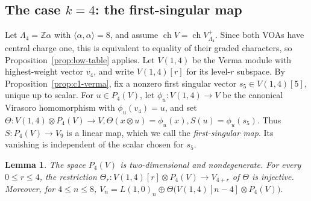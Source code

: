 \documentclass[12pt,leqno]{amsart}
\numberwithin{equation}{section} \newtheorem{thm}{Theorem}[section] \newtheorem{lem}[thm]{Lemma} \newtheorem{ex}[thm]{Example} \newtheorem{prop}[thm]{Proposition} \newtheorem{cor}[thm]{Corollary} \newtheorem{defi}[thm]{Definition} \newtheorem{rmk}[thm]{Remark} \newtheorem{notation}[thm]{Notation}
\newcommand{\ch}{\operatorname{ch}}
\def\Z{\mathbb{Z}} \def\N{\mathbb{N}} \def\A{\mathbb{A}} \def\C{\mathbb{C}} \def\R{\mathbb{R}} \def\Q{\mathbb{Q}} \def\F{\mathbb{F}}
\begin{document}
\subsection{The case \texorpdfstring{$k=4$}{k=4}: the first-singular map}

Let $\Lambda_4=\Z\alpha$ with $\langle\alpha,\alpha\rangle=8$, and assume \(\ch V=\ch V_{\Lambda_4}^+.\) Since both VOAs have central charge one, this is equivalent to equality of their graded characters, so Proposition~\ref{prop:low-table} applies. Let $V(1,4)$ be the Verma module with highest-weight vector $v_4$, and write $V(1,4)[r]$ for its level-$r$ subspace. By Proposition~\ref{prop:c1-verma}, fix a nonzero first singular vector $s_5\in V(1,4)[5]$, unique up to scalar. For $u\in P_4(V)$, let \(\phi_u:V(1,4)\to V\) be the canonical Virasoro homomorphism with $\phi_u(v_4)=u$, and set \(\Theta:V(1,4)\otimes P_4(V)\longrightarrow V, \Theta(x\otimes u)=\phi_u(x), S(u)=\phi_u(s_5)\). Thus $S:P_4(V)\to V_9$ is a linear map, which we call the \emph{first-singular map}. Its vanishing is independent of the scalar chosen for $s_5$.

\begin{lem}\label{lem:k4-saturation8}
The space $P_4(V)$ is two-dimensional and nondegenerate. For every $0\le r\le4$, the restriction \(\Theta_r:V(1,4)[r]\otimes P_4(V)\longrightarrow V_{4+r}\) of $\Theta$ is injective. Moreover, for $4\le n\le8$, \(V_n=L(1,0)_n\oplus \Theta\bigl(V(1,4)[n-4]\otimes P_4(V)\bigr).\)
\end{lem}
\end{document}
